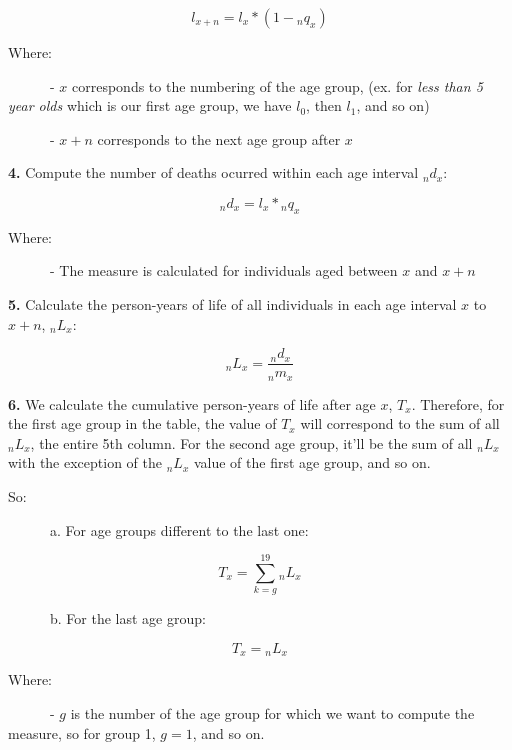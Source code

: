 \documentclass[
  a4paper]{article}
\begin{document}
\begin{equation}
\tag{3}
l_{x + n} = l_x * (1 - {}_{n}q_{x})
\end{equation}

Where:

~~~~~~- \(x\) corresponds to the numbering of the age group, (ex. for
\emph{less than 5 year olds} which is our first age group, we have
\(l_0\), then \(l_1\), and so on)

~~~~~~- \(x+n\) corresponds to the next age group after \(x\)

\textbf{4.} Compute the number of deaths ocurred within each age
interval \({}_{n}d_{x}\):

\begin{equation}
\tag{4}
{}_{n}d_{x} = l_x * {}_{n}q_{x}
\end{equation}

Where:

~~~~~~- The measure is calculated for individuals aged between \(x\) and
\(x+n\)

\textbf{5.} Calculate the person-years of life of all individuals in
each age interval \(x\) to \(x+n\), \({}_{n}L_{x}\):

\begin{equation}
\tag{5}
{}_{n}L_{x} = \frac{{}_{n}d_{x}}{{}_{n}m_{x}}
\end{equation}

\textbf{6.} We calculate the cumulative person-years of life after age
\(x\), \(T_x\). Therefore, for the first age group in the table, the
value of \(T_x\) will correspond to the sum of all \({}_{n}L_{x}\), the
entire 5th column. For the second age group, it'll be the sum of all
\({}_{n}L_{x}\) with the exception of the \({}_{n}L_{x}\) value of the
first age group, and so on.

So:

~~~~~~a. For age groups different to the last one:

\begin{equation}
\tag{6.1}
T_x = \sum^{19}_{k=g} {}_{n}L_{x}
\end{equation}

~~~~~~b. For the last age group:

\begin{equation}
\tag{6.2}
T_x = {}_{n}L_{x}
\end{equation}

Where:

~~~~~~- \(g\) is the number of the age group for which we want to
compute the measure, so for group 1, \(g=1\), and so on.
\end{document}
